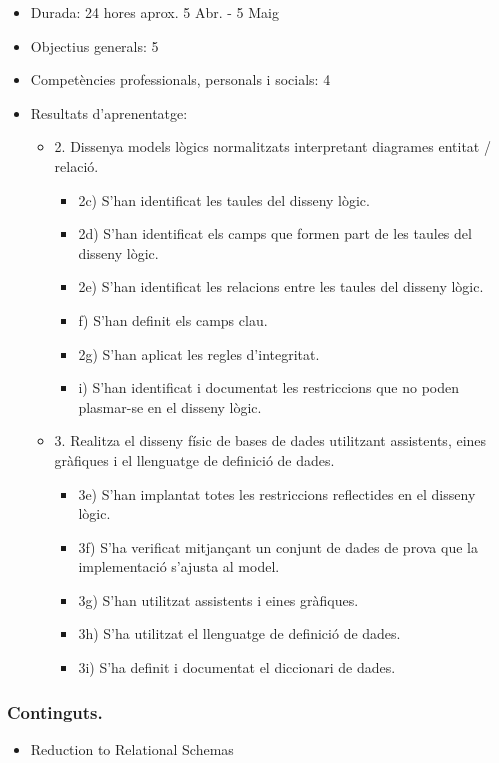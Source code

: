 \documentclass[catalan, a4paper, 12pt, titlepage]{article}
\begin{document}
  \begin{itemize}
	\item Durada: 24 hores aprox. 5 Abr. - 5 Maig
	\item Objectius generals: 5
	\item Competències professionals, personals i socials: 4
	\item Resultats d'aprenentatge: 
		\begin{itemize}
			\item 2. Dissenya models lògics normalitzats interpretant diagrames entitat / relació.
				\begin{itemize}
					\item 2c) S'han identificat les taules del disseny lògic.
					\item 2d) S'han identificat els camps que formen part de les taules del disseny lògic.
					\item 2e) S'han identificat les relacions entre les taules del disseny lògic.
					\item f) S'han definit els camps clau.
					\item 2g) S'han aplicat les regles d'integritat.
					\item i) S'han identificat i documentat les restriccions que no poden plasmar-se en el disseny lògic.
				\end{itemize}
			\item 3. Realitza el disseny físic de bases de dades utilitzant assistents, eines gràfiques i el llenguatge de definició de dades.
				\begin{itemize}
					\item 3e) S'han implantat totes les restriccions reflectides en el disseny lògic.
					\item 3f) S'ha verificat mitjançant un conjunt de dades de prova que la implementació s'ajusta al model.
					\item 3g) S'han utilitzat assistents i eines gràfiques.
					\item 3h) S'ha utilitzat el llenguatge de definició de dades.
					\item 3i) S'ha definit i documentat el diccionari de dades.
				\end{itemize}
		\end{itemize}
  \end{itemize}

  \subsubsection{Continguts.}
  \begin{itemize}
	\item Reduction to Relational Schemas
  \end{itemize}
\end{document}
